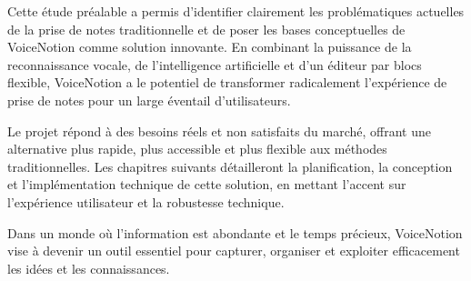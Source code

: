 Cette étude préalable a permis d'identifier clairement les problématiques actuelles de la prise de notes traditionnelle et de poser les bases conceptuelles de VoiceNotion comme solution innovante. En combinant la puissance de la reconnaissance vocale, de l'intelligence artificielle et d'un éditeur par blocs flexible, VoiceNotion a le potentiel de transformer radicalement l'expérience de prise de notes pour un large éventail d'utilisateurs.

Le projet répond à des besoins réels et non satisfaits du marché, offrant une alternative plus rapide, plus accessible et plus flexible aux méthodes traditionnelles. Les chapitres suivants détailleront la planification, la conception et l'implémentation technique de cette solution, en mettant l'accent sur l'expérience utilisateur et la robustesse technique.

Dans un monde où l'information est abondante et le temps précieux, VoiceNotion vise à devenir un outil essentiel pour capturer, organiser et exploiter efficacement les idées et les connaissances. 